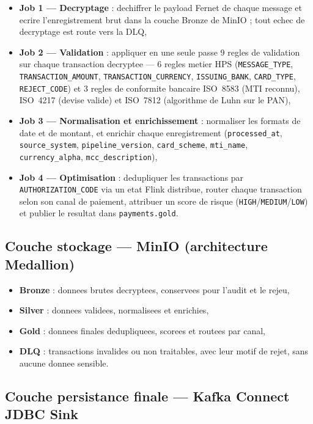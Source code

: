 \begin{itemize}
    \item \textbf{Job 1 --- Decryptage} : dechiffrer le payload Fernet de chaque
    message et ecrire l'enregistrement brut dans la couche Bronze de MinIO ; tout
    echec de decryptage est route vers la DLQ,
    \item \textbf{Job 2 --- Validation} : appliquer en une seule passe 9 regles de
    validation sur chaque transaction decryptee --- 6 regles metier HPS
    (\texttt{MESSAGE\_TYPE}, \texttt{TRANSACTION\_AMOUNT}, \texttt{TRANSACTION\_CURRENCY},
    \texttt{ISSUING\_BANK}, \texttt{CARD\_TYPE}, \texttt{REJECT\_CODE}) et 3 regles de
    conformite bancaire ISO~8583 (MTI reconnu), ISO~4217 (devise valide) et ISO~7812
    (algorithme de Luhn sur le PAN),
    \item \textbf{Job 3 --- Normalisation et enrichissement} : normaliser les formats
    de date et de montant, et enrichir chaque enregistrement (\texttt{processed\_at},
    \texttt{source\_system}, \texttt{pipeline\_version}, \texttt{card\_scheme},
    \texttt{mti\_name}, \texttt{currency\_alpha}, \texttt{mcc\_description}),
    \item \textbf{Job 4 --- Optimisation} : dedupliquer les transactions par
    \texttt{AUTHORIZATION\_CODE} via un etat Flink distribue, router chaque
    transaction selon son canal de paiement, attribuer un score de risque
    (\texttt{HIGH}/\texttt{MEDIUM}/\texttt{LOW}) et publier le resultat dans
    \texttt{payments.gold}.
\end{itemize}

\subsection{Couche stockage --- MinIO (architecture Medallion)}

\begin{itemize}
    \item \textbf{Bronze} : donnees brutes decryptees, conservees pour l'audit et le
    rejeu,
    \item \textbf{Silver} : donnees validees, normalisees et enrichies,
    \item \textbf{Gold} : donnees finales dedupliquees, scorees et routees par canal,
    \item \textbf{DLQ} : transactions invalides ou non traitables, avec leur motif de
    rejet, sans aucune donnee sensible.
\end{itemize}

\subsection{Couche persistance finale --- Kafka Connect JDBC Sink}

